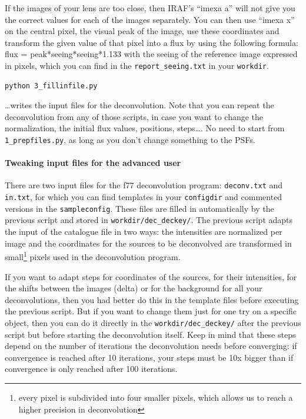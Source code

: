 If the images of your lens are too close, then IRAF's ``imexa a'' will not give you the correct values for each of the images separately. You can then use ``imexa x'' on the central pixel, the visual peak of the image, use these coordinates and transform the given value of that pixel into a flux by using the following formula: flux = peak*seeing*seeing*1.133 with the seeing of the reference image expressed in pixels, which you can find in the \verb+report_seeing.txt+ in your \verb+workdir+.


\begin{Verbatim}
python 3_fillinfile.py
\end{Verbatim}

\ldots writes the input files for the deconvolution. Note that you can repeat the deconvolution from any of those scripts, in case you want to change the normalization, the initial flux values, positions, steps\ldots. No need to start from \verb+1_prepfiles.py+, as long as you don't change something to the PSFs.

\paragraph{Tweaking input files for the advanced user}

There are two input files for the f77 deconvolution program: \verb+deconv.txt+ and \verb+in.txt+, for which you can find templates in your \verb+configdir+ and commented versions in the \verb+sampleconfig+. These files are filled in automatically by the previous script and stored in \verb+workdir/dec_deckey/+. The previous script adapts the input of the catalogue file in two ways: the intensities are normalized per image and the coordinates for the sources to be deconvolved are transformed in small\footnote{every pixel is subdivided into four smaller pixels, which allows us to reach a higher precision in deconvolution} pixels used in the deconvolution program. 

If you want to adapt steps for coordinates of the sources, for their intensities, for the shifts between the images (delta) or for the background for all your deconvolutions, then you had better do this in the template files before executing the previous script. But if you want to change them just for one try on a specific object, then you can do it directly in the \verb+workdir/dec_deckey/+ after the previous script but before starting the deconvolution itself.
Keep in mind that these steps depend on the number of iterations the deconvolution needs before converging: if convergence is reached after 10 iterations, your steps must be 10x bigger than if convergence is only reached after 100 iterations.

